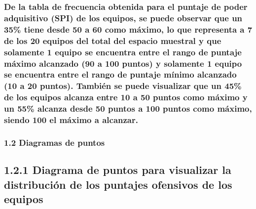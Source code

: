 \documentclass[]{article}
\begin{document}
\hypertarget{de-la-tabla-de-frecuencia-obtenida-para-el-puntaje-de-poder-adquisitivo-spi-de-los-equipos-se-puede-observar-que-un-35-tiene-desde-50-a-60-como-maximo-lo-que-representa-a-7-de-los-20-equipos-del-total-del-espacio-muestral-y-que-solamente-1-equipo-se-encuentra-entre-el-rango-de-puntaje-maximo-alcanzado-90-a-100-puntos-y-solamente-1-equipo-se-encuentra-entre-el-rango-de-puntaje-minimo-alcanzado-10-a-20-puntos.-tambien-se-puede-visualizar-que-un-45-de-los-equipos-alcanza-entre-10-a-50-puntos-como-maximo-y-un-55-alcanza-desde-50-puntos-a-100-puntos-como-maximo-siendo-100-el-maximo-a-alcanzar.}{%
\subsubsection{De la tabla de frecuencia obtenida para el puntaje de
poder adquisitivo (SPI) de los equipos, se puede observar que un 35\%
tiene desde 50 a 60 como máximo, lo que representa a 7 de los 20 equipos
del total del espacio muestral y que solamente 1 equipo se encuentra
entre el rango de puntaje máximo alcanzado (90 a 100 puntos) y solamente
1 equipo se encuentra entre el rango de puntaje mínimo alcanzado (10 a
20 puntos). También se puede visualizar que un 45\% de los equipos
alcanza entre 10 a 50 puntos como máximo y un 55\% alcanza desde 50
puntos a 100 puntos como máximo, siendo 100 el máximo a
alcanzar.}\label{de-la-tabla-de-frecuencia-obtenida-para-el-puntaje-de-poder-adquisitivo-spi-de-los-equipos-se-puede-observar-que-un-35-tiene-desde-50-a-60-como-maximo-lo-que-representa-a-7-de-los-20-equipos-del-total-del-espacio-muestral-y-que-solamente-1-equipo-se-encuentra-entre-el-rango-de-puntaje-maximo-alcanzado-90-a-100-puntos-y-solamente-1-equipo-se-encuentra-entre-el-rango-de-puntaje-minimo-alcanzado-10-a-20-puntos.-tambien-se-puede-visualizar-que-un-45-de-los-equipos-alcanza-entre-10-a-50-puntos-como-maximo-y-un-55-alcanza-desde-50-puntos-a-100-puntos-como-maximo-siendo-100-el-maximo-a-alcanzar.}}

\hypertarget{diagramas-de-puntos}{%
\subsubsection{1.2 Diagramas de puntos}\label{diagramas-de-puntos}}

\hypertarget{diagrama-de-puntos-para-visualizar-la-distribucion-de-los-puntajes-ofensivos-de-los-equipos}{%
\subsection{1.2.1 Diagrama de puntos para visualizar la distribución de
los puntajes ofensivos de los
equipos}\label{diagrama-de-puntos-para-visualizar-la-distribucion-de-los-puntajes-ofensivos-de-los-equipos}}
\end{document}
